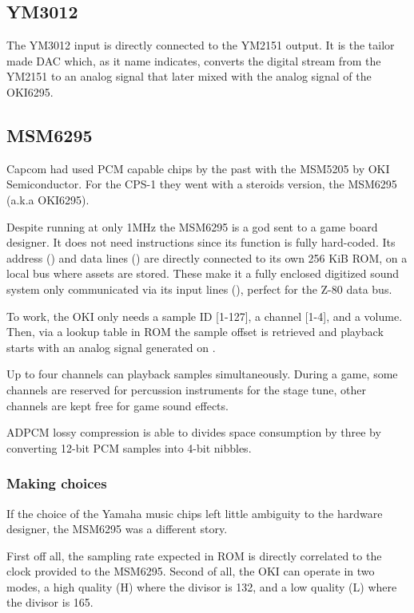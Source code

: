 \subsection{YM3012}
The YM3012 input is directly connected to the YM2151 output. It is the tailor made DAC which, as it name indicates, converts the digital stream from the YM2151 to an analog signal that later mixed with the analog signal of the OKI6295.

\subsection{MSM6295}
Capcom had used PCM capable chips by the past with the MSM5205 by OKI Semiconductor. For the CPS-1  they went with a steroids version, the MSM6295 (a.k.a OKI6295). 

Despite running at only 1MHz the MSM6295 is a god sent to a game board designer. It does not need instructions since its function is fully hard-coded. Its address () and data lines () are directly connected to its own 256 KiB ROM, on a local bus where assets are stored. These make it a fully enclosed digitized sound system only communicated via its input lines (), perfect for the Z-80 data bus.

To work, the OKI only needs a sample ID [1-127], a channel [1-4], and a volume. Then, via a lookup table in ROM the sample offset is retrieved and playback starts with an analog signal generated on . 


Up to four channels can playback samples simultaneously. During a game, some channels are reserved for percussion instruments for the stage tune, other channels are kept free for game sound effects.

 ADPCM lossy compression is able to divides space consumption by three by converting 12-bit PCM samples into 4-bit nibbles. 


\subsubsection{Making choices}
If the choice of the Yamaha music chips left little ambiguity to the hardware designer, the MSM6295 was a different story.

First off all, the sampling rate expected in ROM is directly correlated to the clock provided to the MSM6295. Second of all, the OKI can operate in two modes, a high quality (H) where the divisor is 132, and a low quality (L) where the divisor is 165.

